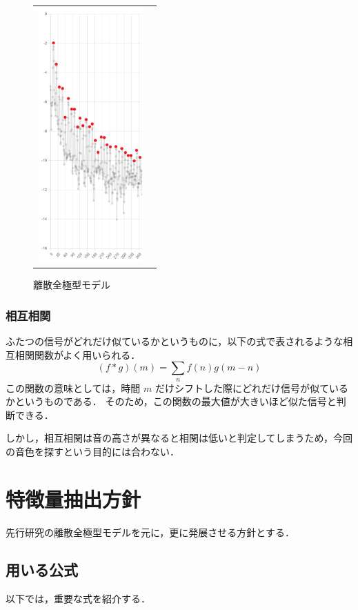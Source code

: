 \documentclass[uplatex,a4paper,11pt]{jsarticle}
\begin{document}
\begin{figure}[h]
\begin{tabular}{cc}
\begin{minipage}[t]{0.33\hsize}
      \includegraphics[width=40mm]{picture/dap.png}
      \caption{離散全極型モデル}
      \label{fig:dap}
    \end{minipage}
  \end{tabular}
\end{figure}

\subsubsection{相互相関}
ふたつの信号がどれだけ似ているかというものに，以下の式で表されるような相互相関関数がよく用いられる．
\begin{displaymath}
  (f*g)(m) = \sum_n f(n)g(m-n)
\end{displaymath}
この関数の意味としては，時間
\begin{math}
  m
\end{math}
だけシフトした際にどれだけ信号が似ているかというものである．
そのため，この関数の最大値が大きいほど似た信号と判断できる．

しかし，相互相関は音の高さが異なると相関は低いと判定してしまうため，今回の音色を探すという目的には合わない．


\section{特徴量抽出方針}
先行研究の離散全極型モデルを元に，更に発展させる方針とする．

\subsection{用いる公式}
以下では，重要な式を紹介する．
\end{document}
